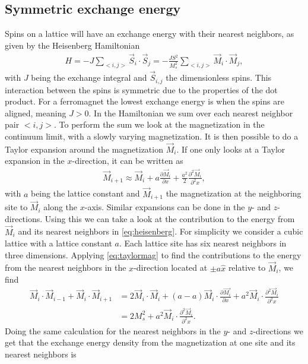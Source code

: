 \documentclass[12pt, a4paper, twoside, openright]{article}		%
\numberwithin{equation}{section}
\begin{document}
\subsection{Symmetric exchange energy}
Spins on a lattice will have an exchange energy with their nearest neighbors, as given by the Heisenberg Hamiltonian
\begin{align}
\label{eq:heisenberg}
H = -J\sum_{<i, j>} \vec{S}_i\cdot\vec{S}_j = -\frac{J S^2}{M_s^2}\sum_{<i, j>} \vec{M}_i\cdot\vec{M}_j,
\end{align}
with $J$ being the exchange integral and $\vec{S}_{i,j}$ the dimensionless spins. This interaction between the spins is symmetric due to the properties of the dot product. For a ferromagnet the lowest exchange energy is when the spins are aligned, meaning $J>0$. In the Hamiltonian we sum over each nearest neighbor pair $<i, j>$. To perform the sum we look at the magnetization in the continuum limit, with a slowly varying magnetization. It is then possible to do a Taylor expansion around the magnetization $\vec{M}_i$. If one only looks at a Taylor expansion in the $x$-direction, it can be written as
\begin{align}
\label{eq:taylormag}
\vec{M}_{i+1} \approx \vec{M}_i + a\frac{\partial \vec{M}_i}{\partial x} + \frac{a^2}{2}\frac{\partial^2 \vec{M}_i}{\partial^2 x},
\end{align}
with $a$ being the lattice constant and $\vec{M}_{i+1}$ the magnetization at the neighboring site to $\vec{M}_i$ along the $x$-axis. Similar expansions can be done in the $y$- and $z$-directions. Using this we can take a look at the contribution to the energy from $\vec{M}_i$ and its nearest neighbors in \eqref{eq:heisenberg}. For simplicity we consider a cubic lattice with a lattice constant $a$. Each lattice site has six nearest neighbors in three dimensions. Applying \eqref{eq:taylormag} to find the contributions to the energy from the nearest neighbors in the $x$-direction located at $\pm a \hat{x}$ relative to $\vec{M}_i$, we find
\begin{align*}
\vec{M}_i\cdot\vec{M}_{i-1}+\vec{M}_i\cdot\vec{M}_{i+1} &= 2\vec{M}_i\cdot\vec{M}_i + (a - a) \vec{M}_i\cdot\frac{\partial \vec{M_i}}{\partial x} + a^2\vec{M}_i\cdot\frac{\partial^2 \vec{M}_i}{\partial^2 x} \\
&= 2M_s^2 + a^2\vec{M}_i\cdot\frac{\partial^2 \vec{M}_i}{\partial^2 x}.
\end{align*}
Doing the same calculation for the nearest neighbors in the $y$- and $z$-directions we get that the exchange energy density from the magnetization at one site and its nearest neighbors is
\end{document}
